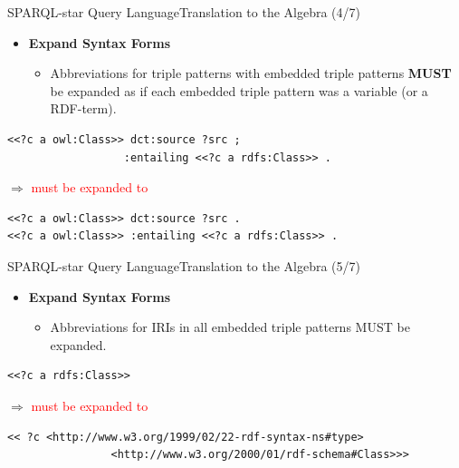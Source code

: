 \documentclass[aspectratio=169]{beamer}
\begin{document}
\begin{frame}[fragile]{SPARQL-star Query Language}{Translation to the Algebra (4/7)}
    \begin{itemize}
        \item \textbf{Expand Syntax Forms}
            \begin{itemize}
                \item Abbreviations for triple patterns with embedded triple patterns \textbf{MUST} be expanded as if each embedded triple pattern was a variable (or a RDF-term).
            \end{itemize}
    \end{itemize}
                    \begin{lstlisting}[language=TTL ]
<<?c a owl:Class>> dct:source ?src ;
                  :entailing <<?c a rdfs:Class>> .
                \end{lstlisting}
                $\Rightarrow$ \textcolor{red}{must be expanded to}
                    \begin{lstlisting}[language=TTL ]
<<?c a owl:Class>> dct:source ?src .
<<?c a owl:Class>> :entailing <<?c a rdfs:Class>> .
                \end{lstlisting}
\end{frame}

\begin{frame}[fragile]{SPARQL-star Query Language}{Translation to the Algebra (5/7)}
    \begin{itemize}
        \item \textbf{Expand Syntax Forms}
            \begin{itemize}
                \item Abbreviations for IRIs in all embedded triple patterns MUST be expanded.
            \end{itemize}
    \end{itemize}
\begin{lstlisting}[language=TTL ]
<<?c a rdfs:Class>>
\end{lstlisting}
   $\Rightarrow$ \textcolor{red}{must be expanded to}
\begin{lstlisting}[language=TTL ]
<< ?c <http://www.w3.org/1999/02/22-rdf-syntax-ns#type>
                <http://www.w3.org/2000/01/rdf-schema#Class>>>
\end{lstlisting}
\end{frame}
\end{document}
